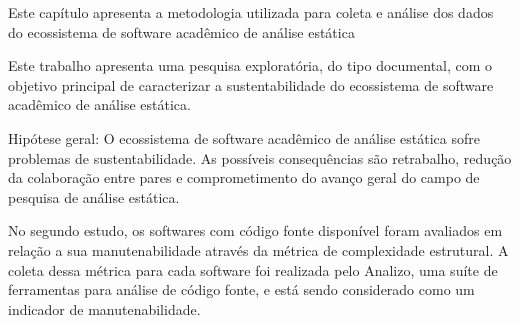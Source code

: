 {Este capítulo apresenta a metodologia utilizada para coleta e análise dos
dados do ecossistema de software acadêmico de análise estática}
\label{metodologia}

Este trabalho apresenta uma pesquisa exploratória, 
do tipo documental, com o objetivo principal de 
caracterizar a sustentabilidade
do ecossistema de software acadêmico de análise estática.

Hipótese geral: O ecossistema de software acadêmico de análise
estática sofre %
problemas de sustentabilidade. 
As possíveis consequências são retrabalho,
redução da colaboração entre pares e 
comprometimento do avanço geral do campo de pesquisa de
análise estática.






No segundo estudo, os softwares com código fonte disponível foram avaliados em
relação a sua manutenabilidade através da métrica de complexidade estrutural. A
coleta dessa métrica para cada software foi realizada pelo Analizo, uma suíte
de ferramentas para análise de código fonte, e está sendo considerado como um
indicador de manutenabilidade.




